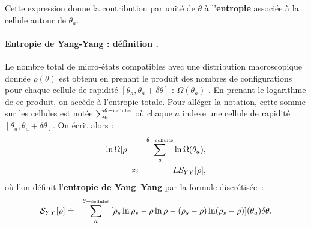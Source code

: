 Cette expression donne la contribution par unité de $\theta$ à l’{\bf entropie}  associée à la cellule autour de $\theta_a$.

\paragraph{Entropie de Yang-Yang : définition .}



Le nombre total de micro-états compatibles avec une distribution macroscopique donnée $\rho(\theta)$ est obtenu en prenant le produit des nombres de configurations pour chaque cellule de rapidité $[\theta_a, \theta_a + \delta \theta]$ : $ \Omega(\theta_a)$ .
En prenant le logarithme de ce produit, on accède à l'entropie totale. Pour alléger la notation, cette somme sur les cellules est notée
\(
	\sum_a^{\theta-\mbox{\tiny cellules}}	
\)
où chaque $a$ indexe une cellule de rapidité $[\theta_a, \theta_a + \delta\theta]$.
On écrit alors :
\begin{eqnarray}
    \ln \Omega[\rho] & = & \sum_a^{\theta-\mbox{\tiny cellules}} \ln \Omega(\theta_a), \\
    & \approx &   L\mathcal{S}_{YY} [ \rho ] , 	
\end{eqnarray}
où l’on définit l’\textbf{entropie de Yang–Yang} par la formule discrétisée :
\begin{eqnarray}
    \mathcal{S}_{YY}[\rho] & \doteq & \sum_a^{\theta-\mbox{\tiny cellules}} \, [ \rho_s\ln \rho_s - \rho \ln \rho - ( \rho_s - \rho ) \ln ( \rho_s - \rho ) ] (\theta_a) \delta \theta .
\end{eqnarray}

